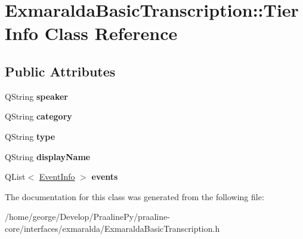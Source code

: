 \hypertarget{class_exmaralda_basic_transcription_1_1_tier_info}{}\section{Exmaralda\+Basic\+Transcription\+:\+:Tier\+Info Class Reference}
\label{class_exmaralda_basic_transcription_1_1_tier_info}
\subsection*{Public Attributes}
\begin{DoxyCompactItemize}
\item 
\mbox{\label{class_exmaralda_basic_transcription_1_1_tier_info_a2626059f704df2c01db24d1678efdf5f}} 
Q\+String {\bfseries speaker}
\item 
\mbox{\label{class_exmaralda_basic_transcription_1_1_tier_info_afda042dadb667ffdfa2ea8a382faf160}} 
Q\+String {\bfseries category}
\item 
\mbox{\label{class_exmaralda_basic_transcription_1_1_tier_info_a3dbdad946d72316fc787f04681acb238}} 
Q\+String {\bfseries type}
\item 
\mbox{\label{class_exmaralda_basic_transcription_1_1_tier_info_a90839b0661aae119803795b771ba5e0a}} 
Q\+String {\bfseries display\+Name}
\item 
\mbox{\label{class_exmaralda_basic_transcription_1_1_tier_info_afe3d8f8ea03390398c92824eb708165f}} 
Q\+List$<$ \hyperlink{class_exmaralda_basic_transcription_1_1_event_info}{Event\+Info} $>$ {\bfseries events}
\end{DoxyCompactItemize}


The documentation for this class was generated from the following file\+:\begin{DoxyCompactItemize}
\item 
/home/george/\+Develop/\+Praaline\+Py/praaline-\/core/interfaces/exmaralda/Exmaralda\+Basic\+Transcription.\+h\end{DoxyCompactItemize}
